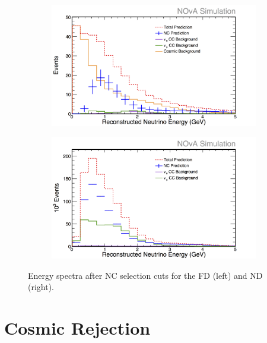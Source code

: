 \begin{figure}[h]
  \centering
  \begin{subfigure}{.48\textwidth}
    \centering
    \includegraphics[width=1\linewidth]{figures/RecoE5FD.png}
  \end{subfigure}
  \begin{subfigure}{.48\textwidth}
    \centering
    \includegraphics[width=1\linewidth]{figures/RecoE5ND.png}
  \end{subfigure}
  \caption[Energy Spectra After NC Selection Cuts]{Energy spectra after NC selection cuts for the FD (left) and ND (right).}
  \label{fig:NP1NCSel}
\end{figure}

\section{Cosmic Rejection}


